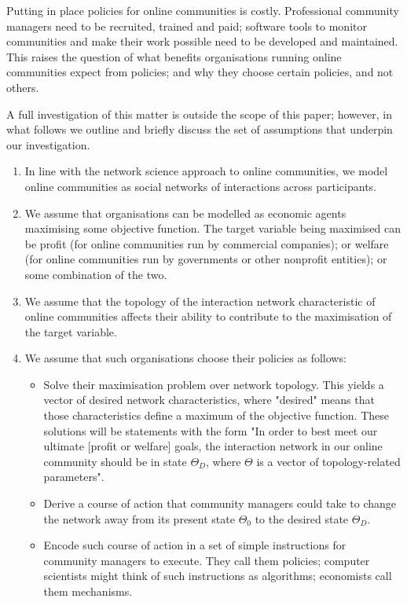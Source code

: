 \documentclass{article}
\begin{document}
Putting in place policies for online communities is costly. Professional community managers need to be recruited, trained and paid; software tools to monitor communities and make their work possible need to be developed and maintained. This raises the question of what benefits organisations running online communities expect from policies; and why they choose certain policies, and not others. 

A full investigation of this matter is outside the scope of this paper; however, in what follows we outline and briefly discuss the set of assumptions that underpin our investigation. 

\begin{enumerate}
\item In line with the network science approach to online communities, we model online communities as social networks of interactions across participants. 
\item We assume that organisations can be modelled as economic agents maximising some objective function. The target variable being maximised can be profit (for online communities run by commercial companies); or welfare (for online communities run by governments or other nonprofit entities); or some combination of the two. 
\item We assume that the topology of the interaction network characteristic of online communities affects their ability to contribute to the maximisation of the target variable. 
\item We assume that such organisations choose their policies as follows: 
\begin{itemize} 
	\item Solve their maximisation problem over network topology. This yields a vector of desired network characteristics, where "desired" means that those characteristics define a maximum of the objective function. These solutions will be statements with the form "In order to best meet our ultimate [profit or welfare] goals, the interaction network in our online community should be in state $\Theta_D$, where $\Theta$ is a vector of topology-related parameters".
	\item Derive a course of action that community managers could take to change the network away from its present state $\Theta_0$ to the desired state $\Theta_D$.
	\item Encode such course of action in a set of simple instructions for community managers to execute. They call them policies;  computer scientists might think of such instructions as algorithms; economists call them mechanisms. 
\end{itemize}
\end{enumerate}
\end{document}
